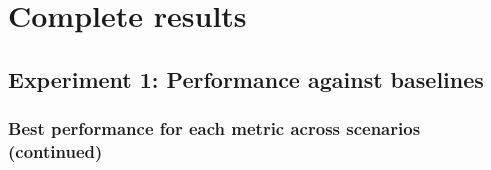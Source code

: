 \chapter[Complete results]{Complete results}\label{ch:app_results}


\hrulefill

\section*{Experiment 1: Performance against baselines} \label{app:ex1_cont}

\subsection*{Best performance for each metric across scenarios (continued)}
